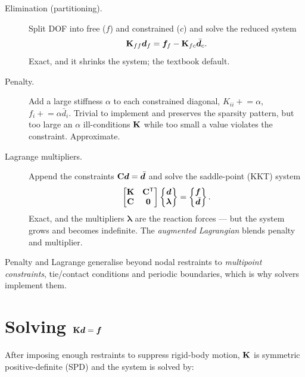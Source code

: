 \begin{description}
  \item[Elimination (partitioning).] Split DOF into free ($f$) and
        constrained ($c$) and solve the reduced system
        \begin{equation}
          \mathbf{K}_{ff}\bm{d}_f = \bm{f}_f - \mathbf{K}_{fc}\bar{\bm{d}}_c .
        \end{equation}
        Exact, and it shrinks the system; the textbook default.
  \item[Penalty.] Add a large stiffness $\alpha$ to each constrained
        diagonal, $K_{ii}\!\mathrel{+}=\!\alpha$,
        $f_i\!\mathrel{+}=\!\alpha\bar d_i$. Trivial to implement and
        preserves the sparsity pattern, but too large an $\alpha$
        ill-conditions $\mathbf{K}$ while too small a value violates the
        constraint. Approximate.
  \item[Lagrange multipliers.] Append the constraints $\mathbf{C}\bm{d}=\bar{\bm{d}}$
        and solve the saddle-point (KKT) system
        \begin{equation}
          \begin{bmatrix}\mathbf{K} & \mathbf{C}^{\mathsf{T}}\\ \mathbf{C} & \mathbf{0}\end{bmatrix}
          \begin{Bmatrix}\bm{d}\\ \bm\lambda\end{Bmatrix}
          = \begin{Bmatrix}\bm{f}\\ \bar{\bm{d}}\end{Bmatrix} .
        \end{equation}
        Exact, and the multipliers $\bm\lambda$ are the reaction forces
        --- but the system grows and becomes indefinite. The
        \emph{augmented Lagrangian} blends penalty and multiplier.
\end{description}
Penalty and Lagrange generalise beyond nodal restraints to
\emph{multipoint constraints}, tie/contact conditions and periodic
boundaries, which is why solvers implement them.

\section{Solving \texorpdfstring{$\mathbf{K}\bm{d}=\bm{f}$}{Ku=f}}

After imposing enough restraints to suppress rigid-body motion, $\mathbf{K}$
is symmetric positive-definite (SPD) and the system is solved by:


